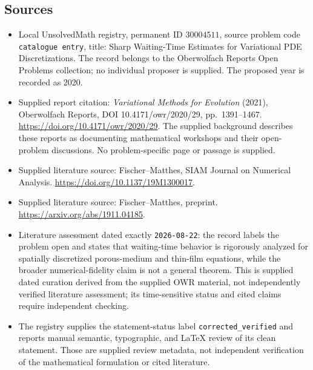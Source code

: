 \documentclass[11pt]{article}
\begin{document}
\subsection{Sources}
\begin{itemize}
\item Local UnsolvedMath registry, permanent ID \(30004511\), source problem code \texttt{catalogue entry}, title: Sharp Waiting-Time Estimates for Variational PDE Discretizations. The record belongs to the Oberwolfach Reports Open Problems collection; no individual proposer is supplied. The proposed year is recorded as 2020.
\item Supplied report citation: \emph{Variational Methods for Evolution} (2021), Oberwolfach Reports, DOI 10.4171/owr/2020/29, pp.\ 1391--1467. \url{https://doi.org/10.4171/owr/2020/29}. The supplied background describes these reports as documenting mathematical workshops and their open-problem discussions. No problem-specific page or passage is supplied.
\item Supplied literature source: Fischer--Matthes, SIAM Journal on Numerical Analysis. \url{https://doi.org/10.1137/19M1300017}.
\item Supplied literature source: Fischer--Matthes, preprint. \url{https://arxiv.org/abs/1911.04185}.
\item Literature assessment dated exactly \texttt{2026-08-22}: the record labels the problem open and states that waiting-time behavior is rigorously analyzed for spatially discretized porous-medium and thin-film equations, while the broader numerical-fidelity claim is not a general theorem. This is supplied dated curation derived from the supplied OWR material, not independently verified literature assessment; its time-sensitive status and cited claims require independent checking.
\item The registry supplies the statement-status label \texttt{corrected\_verified} and reports manual semantic, typographic, and LaTeX review of its clean statement. Those are supplied review metadata, not independent verification of the mathematical formulation or cited literature.
\end{itemize}
\end{document}
